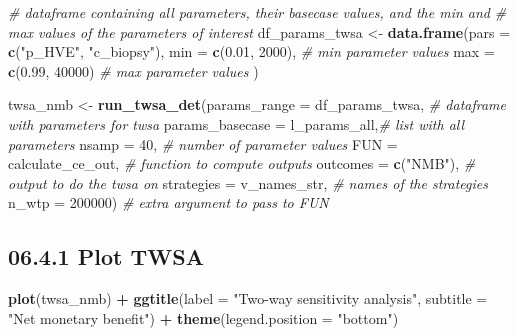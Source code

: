 \documentclass[]{article}
\newenvironment{Shaded}{\begin{snugshade}}{\end{snugshade}}
\newcommand{\KeywordTok}[1]{\textcolor[rgb]{0.13,0.29,0.53}{\textbf{#1}}}
\newcommand{\DataTypeTok}[1]{\textcolor[rgb]{0.13,0.29,0.53}{#1}}
\newcommand{\DecValTok}[1]{\textcolor[rgb]{0.00,0.00,0.81}{#1}}
\newcommand{\FloatTok}[1]{\textcolor[rgb]{0.00,0.00,0.81}{#1}}
\newcommand{\StringTok}[1]{\textcolor[rgb]{0.31,0.60,0.02}{#1}}
\newcommand{\CommentTok}[1]{\textcolor[rgb]{0.56,0.35,0.01}{\textit{#1}}}
\newcommand{\OperatorTok}[1]{\textcolor[rgb]{0.81,0.36,0.00}{\textbf{#1}}}
\newcommand{\NormalTok}[1]{#1}
\begin{document}
\begin{Shaded}
\begin{Highlighting}[]
\CommentTok{# dataframe containing all parameters, their basecase values, and the min and }
\CommentTok{# max values of the parameters of interest}
\NormalTok{df_params_twsa <-}\StringTok{ }\KeywordTok{data.frame}\NormalTok{(}\DataTypeTok{pars =} \KeywordTok{c}\NormalTok{(}\StringTok{"p_HVE"}\NormalTok{, }\StringTok{"c_biopsy"}\NormalTok{),}
                              \DataTypeTok{min  =} \KeywordTok{c}\NormalTok{(}\FloatTok{0.01}\NormalTok{, }\DecValTok{2000}\NormalTok{), }\CommentTok{# min parameter values}
                              \DataTypeTok{max  =} \KeywordTok{c}\NormalTok{(}\FloatTok{0.99}\NormalTok{, }\DecValTok{40000}\NormalTok{) }\CommentTok{# max parameter values}
\NormalTok{                              )}

\NormalTok{twsa_nmb <-}\StringTok{ }\KeywordTok{run_twsa_det}\NormalTok{(}\DataTypeTok{params_range =}\NormalTok{ df_params_twsa, }\CommentTok{# dataframe with parameters for twsa}
                         \DataTypeTok{params_basecase =}\NormalTok{ l_params_all,}\CommentTok{# list with all parameters}
                         \DataTypeTok{nsamp      =} \DecValTok{40}\NormalTok{,               }\CommentTok{# number of parameter values}
                         \DataTypeTok{FUN        =}\NormalTok{ calculate_ce_out, }\CommentTok{# function to compute outputs}
                         \DataTypeTok{outcomes   =} \KeywordTok{c}\NormalTok{(}\StringTok{"NMB"}\NormalTok{),         }\CommentTok{# output to do the twsa on}
                         \DataTypeTok{strategies =}\NormalTok{ v_names_str,      }\CommentTok{# names of the strategies}
                         \DataTypeTok{n_wtp      =} \DecValTok{200000}\NormalTok{)           }\CommentTok{# extra argument to pass to FUN}
\end{Highlighting}
\end{Shaded}

\subsection{06.4.1 Plot TWSA}\label{plot-twsa}

\begin{Shaded}
\begin{Highlighting}[]
\KeywordTok{plot}\NormalTok{(twsa_nmb) }\OperatorTok{+}\StringTok{ }
\StringTok{  }\KeywordTok{ggtitle}\NormalTok{(}\DataTypeTok{label =} \StringTok{"Two-way sensitivity analysis"}\NormalTok{, }
          \DataTypeTok{subtitle =} \StringTok{"Net monetary benefit"}\NormalTok{) }\OperatorTok{+}
\StringTok{          }\KeywordTok{theme}\NormalTok{(}\DataTypeTok{legend.position =} \StringTok{"bottom"}\NormalTok{)}
\end{Highlighting}
\end{Shaded}
\end{document}

